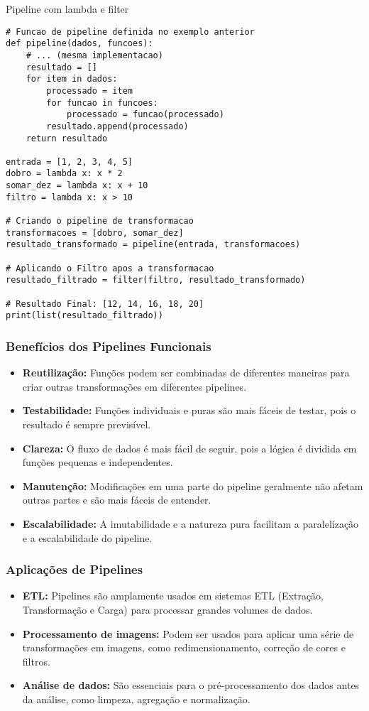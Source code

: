 \begin{codelisting}{Pipeline com lambda e filter}
    \label{listing:pipeline_lambda}
    \begin{verbatim}
# Funcao de pipeline definida no exemplo anterior
def pipeline(dados, funcoes):
    # ... (mesma implementacao)
    resultado = []
    for item in dados:
        processado = item
        for funcao in funcoes:
            processado = funcao(processado)
        resultado.append(processado)
    return resultado

entrada = [1, 2, 3, 4, 5]
dobro = lambda x: x * 2
somar_dez = lambda x: x + 10
filtro = lambda x: x > 10

# Criando o pipeline de transformacao
transformacoes = [dobro, somar_dez]
resultado_transformado = pipeline(entrada, transformacoes)

# Aplicando o Filtro apos a transformacao
resultado_filtrado = filter(filtro, resultado_transformado)

# Resultado Final: [12, 14, 16, 18, 20]
print(list(resultado_filtrado))
    \end{verbatim}
\end{codelisting}

\subsubsection{Benefícios dos Pipelines Funcionais}
\begin{itemize}
    \item \textbf{Reutilização:} Funções podem ser combinadas de diferentes maneiras para criar outras transformações em diferentes pipelines.
    \item \textbf{Testabilidade:} Funções individuais e puras são mais fáceis de testar, pois o resultado é sempre previsível.
    \item \textbf{Clareza:} O fluxo de dados é mais fácil de seguir, pois a lógica é dividida em funções pequenas e independentes.
    \item \textbf{Manutenção:} Modificações em uma parte do pipeline geralmente não afetam outras partes e são mais fáceis de entender.
    \item \textbf{Escalabilidade:} A imutabilidade e a natureza pura facilitam a paralelização e a escalabilidade do pipeline.
\end{itemize}

\subsubsection{Aplicações de Pipelines}
\begin{itemize}
    \item \textbf{ETL:} Pipelines são amplamente usados em sistemas ETL (Extração, Transformação e Carga) para processar grandes volumes de dados.
    \item \textbf{Processamento de imagens:} Podem ser usados para aplicar uma série de transformações em imagens, como redimensionamento, correção de cores e filtros.
    \item \textbf{Análise de dados:} São essenciais para o pré-processamento dos dados antes da análise, como limpeza, agregação e normalização.
\end{itemize}

